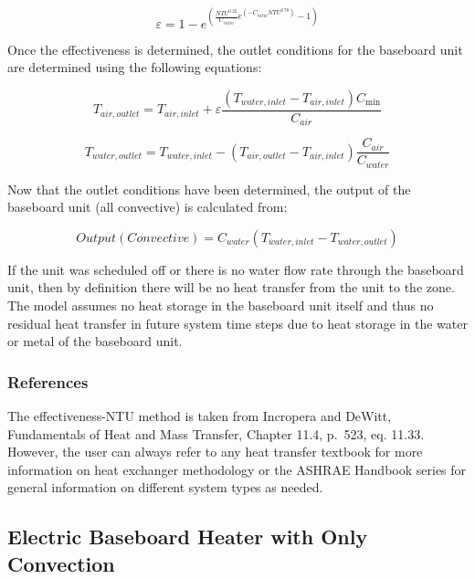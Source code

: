 \begin{equation}
\varepsilon  = 1 - {e^{\left( {\frac{{NT{U^{0.22}}}}{{{C_{ratio}}}}{e^{\left( { - {C_{ratio}}NT{U^{0.78}}} \right)}} - 1} \right)}}
\end{equation}

Once the effectiveness is determined, the outlet conditions for the baseboard unit are determined using the following equations:

\begin{equation}
{T_{air,outlet}} = {T_{air,inlet}} + \varepsilon {\frac{{\left( {{T_{water,inlet}} - {T_{air,inlet}}} \right){C_{\min }}}}{{C_{air}}}}
\end{equation}

\begin{equation}
{T_{water,outlet}} = {T_{water,inlet}} - \left( {{T_{air,outlet}} - {T_{air,inlet}}} \right){\frac{{{C_{air}}}}{{C_{water}}}}
\end{equation}

Now that the outlet conditions have been determined, the output of the baseboard unit (all convective) is calculated from:

\begin{equation}
Output\left( {Convective} \right) = {C_{water}}\left( {{T_{water,inlet}} - {T_{water,outlet}}} \right)
\end{equation}

If the unit was scheduled off or there is no water flow rate through the baseboard unit, then by definition there will be no heat transfer from the unit to the zone. The model assumes no heat storage in the baseboard unit itself and thus no residual heat transfer in future system time steps due to heat storage in the water or metal of the baseboard unit.

\subsubsection{References}\label{references-006}

The effectiveness-NTU method is taken from Incropera and DeWitt, Fundamentals of Heat and Mass Transfer, Chapter 11.4, p.~523, eq. 11.33. However, the user can always refer to any heat transfer textbook for more information on heat exchanger methodology or the ASHRAE Handbook series for general information on different system types as needed.

\subsection{Electric Baseboard Heater with Only Convection}\label{electric-baseboard-heater-with-only-convection}

